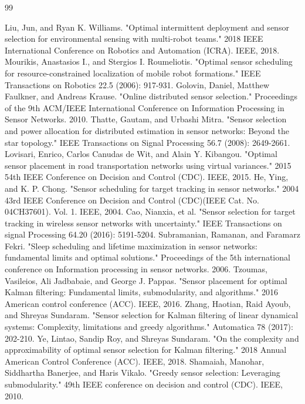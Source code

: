 \documentclass[letterpaper, 10 pt, conference]{ieeeconf}  %
\begin{document}
\begin{thebibliography}{99}

 Liu, Jun, and Ryan K. Williams. "Optimal intermittent deployment and sensor selection for environmental sensing with multi-robot teams." 2018 IEEE International Conference on Robotics and Automation (ICRA). IEEE, 2018.
 Mourikis, Anastasios I., and Stergios I. Roumeliotis. "Optimal sensor scheduling for resource-constrained localization of mobile robot formations." IEEE Transactions on Robotics 22.5 (2006): 917-931.
 Golovin, Daniel, Matthew Faulkner, and Andreas Krause. "Online distributed sensor selection." Proceedings of the 9th ACM/IEEE International Conference on Information Processing in Sensor Networks. 2010.
 Thatte, Gautam, and Urbashi Mitra. "Sensor selection and power allocation for distributed estimation in sensor networks: Beyond the star topology." IEEE Transactions on Signal Processing 56.7 (2008): 2649-2661.
 Lovisari, Enrico, Carlos Canudas de Wit, and Alain Y. Kibangou. "Optimal sensor placement in road transportation networks using virtual variances." 2015 54th IEEE Conference on Decision and Control (CDC). IEEE, 2015.
 He, Ying, and K. P. Chong. "Sensor scheduling for target tracking in sensor networks." 2004 43rd IEEE Conference on Decision and Control (CDC)(IEEE Cat. No. 04CH37601). Vol. 1. IEEE, 2004.
 Cao, Nianxia, et al. "Sensor selection for target tracking in wireless sensor networks with uncertainty." IEEE Transactions on signal Processing 64.20 (2016): 5191-5204.
 Subramanian, Ramanan, and Faramarz Fekri. "Sleep scheduling and lifetime maximization in sensor networks: fundamental limits and optimal solutions." Proceedings of the 5th international conference on Information processing in sensor networks. 2006.
 Tzoumas, Vasileios, Ali Jadbabaie, and George J. Pappas. "Sensor placement for optimal Kalman filtering: Fundamental limits, submodularity, and algorithms." 2016 American control conference (ACC). IEEE, 2016.
 Zhang, Haotian, Raid Ayoub, and Shreyas Sundaram. "Sensor selection for Kalman filtering of linear dynamical systems: Complexity, limitations and greedy algorithms." Automatica 78 (2017): 202-210.
 Ye, Lintao, Sandip Roy, and Shreyas Sundaram. "On the complexity and approximability of optimal sensor selection for Kalman filtering." 2018 Annual American Control Conference (ACC). IEEE, 2018.
 Shamaiah, Manohar, Siddhartha Banerjee, and Haris Vikalo. "Greedy sensor selection: Leveraging submodularity." 49th IEEE conference on decision and control (CDC). IEEE, 2010.

\end{thebibliography}
\end{document}
